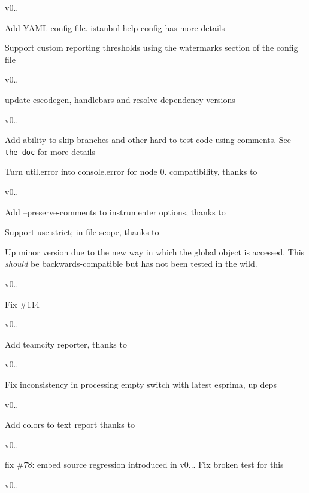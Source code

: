 v0..


\begin{DoxyItemize}
\item Add Y\+A\+M\+L config file. {\ttfamily istanbul help config} has more details 
\item Support custom reporting thresholds using the {\ttfamily watermarks} section of the config file 
\end{DoxyItemize}

v0..

update escodegen, handlebars and resolve dependency versions 

v0..


\begin{DoxyItemize}
\item Add ability to skip branches and other hard-\/to-\/test code using comments. See \href{https://github.com/gotwarlost/istanbul/blob/master/ignoring-code-for-coverage.md}{\tt the doc} for more details 
\item Turn {\ttfamily util.\+error} into {\ttfamily console.\+error} for node 0. compatibility, thanks to  
\end{DoxyItemize}

v0..


\begin{DoxyItemize}
\item Add --preserve-\/comments to instrumenter options, thanks to  
\item Support \textquotesingle{}use strict;\textquotesingle{} in file scope, thanks to  
\end{DoxyItemize}Up minor version due to the new way in which the global object is accessed. This {\itshape should} be backwards-\/compatible but has not been tested in the wild.  

v0..

Fix \#114 

v0..

Add teamcity reporter, thanks to  

v0..

Fix inconsistency in processing empty switch with latest esprima, up deps 

v0..

Add colors to text report thanks to  

v0..

fix \#78\+: embed source regression introduced in v0... Fix broken test for this 

v0..

